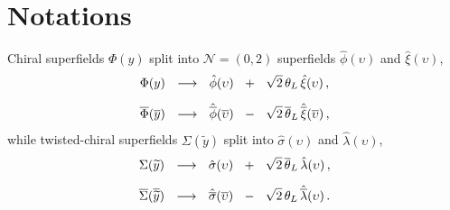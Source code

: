 \documentclass[epsfig,12pt]{article}
\newcommand{\ntwoo}{${\mathcal N}= \left(0,2\right) $ }
\newcommand{\wt}{\widetilde}
\newcommand{\ov}{\overline}
\newcommand{\hphi}{\hat\phi{}}
\newcommand{\hbphi}{\hat{\ov\phi}{}}
\newcommand{\hxi}{\hat\xi{}}
\newcommand{\hbxi}{\hat{\ov\xi}{}}
\newcommand{\hsigma}{\hat\sigma{}}
\newcommand{\hbsigma}{\hat{\ov\sigma}{}}
\newcommand{\hlambda}{\hat\lambda{}}
\newcommand{\hblambda}{\hat{\ov\lambda}{}}
\begin{document}
\section{Notations}
\label{app:notations}
	Chiral superfields $ \Phi(y) $ split into \ntwoo superfields 
	$ \hphi(\upsilon) $ and $ \hxi(\upsilon) $,
\begin{align}
%
\notag
	\Phi(y) &    ~~\longrightarrow~~    \hphi(\upsilon)  ~~+~~  \sqrt{2}\,\theta_L\,\hxi(\upsilon)\,,
	\\[2mm]
%
	\ov\Phi(\ov y) &    ~~\longrightarrow~~    \hbphi(\ov\upsilon)  ~~-~~  \sqrt{2}\,\ov\theta{}_L\,\hbxi(\ov\upsilon)\,,
\end{align}
	while twisted-chiral superfields $ \Sigma(\wt y) $ split into 
	$ \hsigma(\upsilon) $ and $ \hlambda(\upsilon) $,
\begin{align}
%
\notag
	\Sigma(\wt y) &    ~~\longrightarrow~~    \hsigma(\upsilon)  ~~+~~  \sqrt{2}\,\ov\theta{}_L\,\hlambda(\upsilon)\,,
	\\[2mm]
%
	\ov\Sigma(\ov{\wt y}) &    ~~\longrightarrow~~    \hbsigma(\ov\upsilon)  ~~-~~  \sqrt{2}\,\theta_L\,\hblambda(\upsilon)\,.
\end{align}
\end{document}
